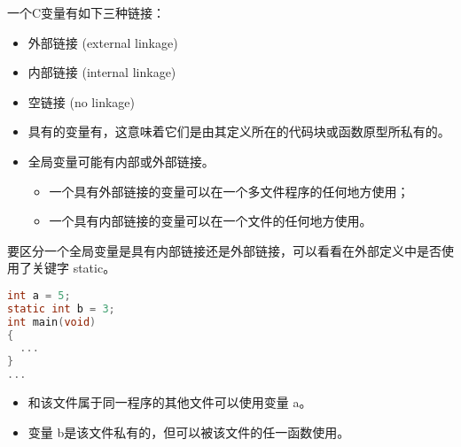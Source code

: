 \begin{frame}[fragile]
一个C变量有如下三种链接：\vspace{0.05in}
\begin{itemize}
\item 外部链接{ (external linkage)} \\[0.1in]
\item 内部链接{ (internal linkage)} \\[0.1in]
\item 空链接{ (no linkage)}
\end{itemize}
\end{frame}


\begin{frame}[fragile]
  \begin{itemize}
  \item 具有的变量有，这意味着它们是由其定义所在的代码块或函数原型所私有的。\\[0.1in]
  \item 全局变量可能有内部或外部链接。\\[0.1in]
    \begin{itemize}
    \item 一个具有外部链接的变量可以在一个多文件程序的任何地方使用；\\[0.1in]
    \item 一个具有内部链接的变量可以在一个文件的任何地方使用。
    \end{itemize}
    
  \end{itemize}
\end{frame}

\begin{frame}[fragile]
  要区分一个全局变量是具有内部链接还是外部链接，可以看看在外部定义中是否使用了关键字{ static}。
  \begin{lstlisting}[language=c,frame=single]
int a = 5;
static int b = 3;
int main(void)
{
  ...
}    
...
  \end{lstlisting}
  \begin{itemize}
  \item 和该文件属于同一程序的其他文件可以使用变量{ a}。
  \item 变量{ b}是该文件私有的，但可以被该文件的任一函数使用。
  \end{itemize}
\end{frame}

